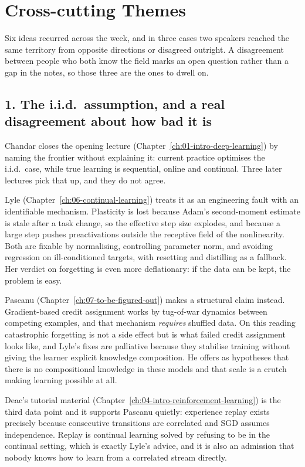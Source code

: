 \chapter{Cross-cutting Themes}
\label{ch:themes}

Six ideas recurred across the week, and in three cases two speakers reached the same territory from
opposite directions or disagreed outright. A disagreement between people who both know the field
marks an open question rather than a gap in the notes, so those three are the ones to dwell on.

\section*{1. The i.i.d.\ assumption, and a real disagreement about how bad it is}

Chandar closes the opening lecture (Chapter~\ref{ch:01-intro-deep-learning}) by naming the frontier
without explaining it: current practice optimises the i.i.d.\ case, while true learning is
sequential, online and continual. Three later lectures pick that up, and they do not agree.

Lyle (Chapter~\ref{ch:06-continual-learning}) treats it as an engineering fault with an identifiable
mechanism. Plasticity is lost because Adam's second-moment estimate is stale after a task change, so
the effective step size explodes, and because a large step pushes preactivations outside the
receptive field of the nonlinearity. Both are fixable by normalising, controlling parameter
norm, and avoiding regression on ill-conditioned targets, with resetting and distilling as a
fallback. Her verdict on forgetting is even more deflationary: if the data can be kept, the problem
is easy.

Pascanu (Chapter~\ref{ch:07-to-be-figured-out}) makes a structural claim instead. Gradient-based
credit assignment works by tug-of-war dynamics between competing examples, and that mechanism
\emph{requires} shuffled data. On this reading catastrophic forgetting is not a side effect but is
what failed credit assignment looks like, and Lyle's fixes are palliative because they stabilise
training without giving the learner explicit knowledge composition. He offers as hypotheses that
there is no compositional knowledge in these models and that scale is a crutch making learning
possible at all.

Deac's tutorial material (Chapter~\ref{ch:04-intro-reinforcement-learning}) is the third data point
and it supports Pascanu quietly: experience replay exists precisely because consecutive transitions
are correlated and SGD assumes independence. Replay is continual learning solved by refusing to be
in the continual setting, which is exactly Lyle's advice, and it is also an admission that nobody
knows how to learn from a correlated stream directly.

